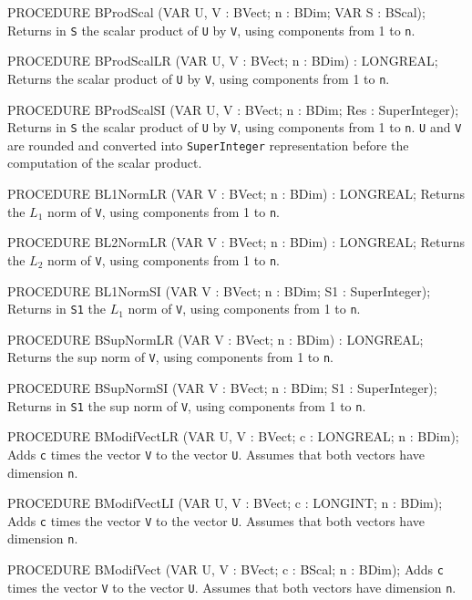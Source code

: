 PROCEDURE BProdScal (VAR U, V : BVect;  n : BDim;  VAR S : BScal);
\endcode
   \tab Returns in {\tt S} the scalar product of {\tt U} by {\tt V},
    using components from 1 to {\tt n}. \endtab
\code

PROCEDURE BProdScalLR (VAR U, V : BVect;  n : BDim) : LONGREAL;
\endcode
   \tab Returns the scalar product of {\tt U} by {\tt V},
    using components from 1 to {\tt n}. \endtab
\code

PROCEDURE BProdScalSI (VAR U, V : BVect; n : BDim; Res : SuperInteger);
\endcode
  \tab  Returns in {\tt S} the scalar product of {\tt U} by {\tt V},
    using components from 1 to {\tt n}.  {\tt U} and {\tt V} are
    rounded and converted into {\tt SuperInteger} representation before
    the computation of the scalar product. \endtab
\code

PROCEDURE BL1NormLR (VAR V : BVect;  n : BDim) : LONGREAL;
\endcode
   \tab Returns the $L_1$ norm of {\tt V},
    using components from 1 to {\tt n}. \endtab
\code

PROCEDURE BL2NormLR (VAR V : BVect;  n : BDim) : LONGREAL;
\endcode
   \tab Returns the $L_2$ norm of {\tt V},
    using components from 1 to {\tt n}. \endtab
\code

PROCEDURE BL1NormSI (VAR V : BVect;  n : BDim;  S1 : SuperInteger);
\endcode
   \tab Returns in {\tt S1} the $L_1$ norm of {\tt V},
    using components from 1 to {\tt n}. \endtab
\code

PROCEDURE BSupNormLR (VAR V : BVect;  n : BDim) : LONGREAL;
\endcode
   \tab Returns the sup norm of {\tt V},
    using components from 1 to {\tt n}. \endtab
\code

PROCEDURE BSupNormSI (VAR V : BVect;  n : BDim;  S1 : SuperInteger);
\endcode
   \tab Returns in {\tt S1} the sup norm of {\tt V},
    using components from 1 to {\tt n}. \endtab
\code

PROCEDURE BModifVectLR (VAR U, V : BVect;  c : LONGREAL;  n : BDim);
\endcode
  \tab  Adds {\tt c} times the vector {\tt V} to the vector {\tt U}.
   Assumes that both vectors have dimension {\tt n}.\endtab
\code

PROCEDURE BModifVectLI (VAR U, V : BVect;  c : LONGINT;  n : BDim);
\endcode
  \tab  Adds {\tt c} times the vector {\tt V} to the vector {\tt U}.
   Assumes that both vectors have dimension {\tt n}.\endtab
\code

PROCEDURE BModifVect (VAR U, V : BVect;  c : BScal;  n : BDim);
\endcode
  \tab  Adds {\tt c} times the vector {\tt V} to the vector {\tt U}.
   Assumes that both vectors have dimension {\tt n}.\endtab
\code

